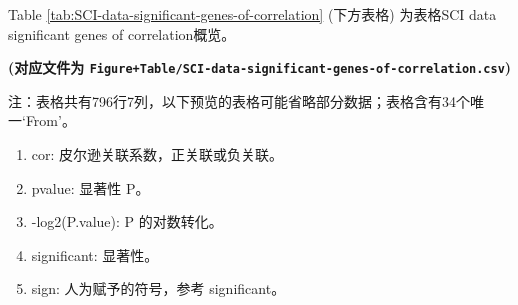 \documentclass[
]{article}
\providecommand{\tightlist}{%
  \setlength{\itemsep}{0pt}\setlength{\parskip}{0pt}}
\begin{document}
Table \ref{tab:SCI-data-significant-genes-of-correlation} (下方表格) 为表格SCI data significant genes of correlation概览。

\textbf{(对应文件为 \texttt{Figure+Table/SCI-data-significant-genes-of-correlation.csv})}

\begin{center}\begin{tcolorbox}[colback=gray!10, colframe=gray!50, width=0.9\linewidth, arc=1mm, boxrule=0.5pt]注：表格共有796行7列，以下预览的表格可能省略部分数据；表格含有34个唯一`From'。
\end{tcolorbox}
\end{center}
\begin{center}\begin{tcolorbox}[colback=gray!10, colframe=gray!50, width=0.9\linewidth, arc=1mm, boxrule=0.5pt]\begin{enumerate}\tightlist
\item cor: 皮尔逊关联系数，正关联或负关联。
\item pvalue: 显著性 P。
\item -log2(P.value): P 的对数转化。
\item significant: 显著性。
\item sign: 人为赋予的符号，参考 significant。
\end{enumerate}\end{tcolorbox}
\end{center}
\end{document}
